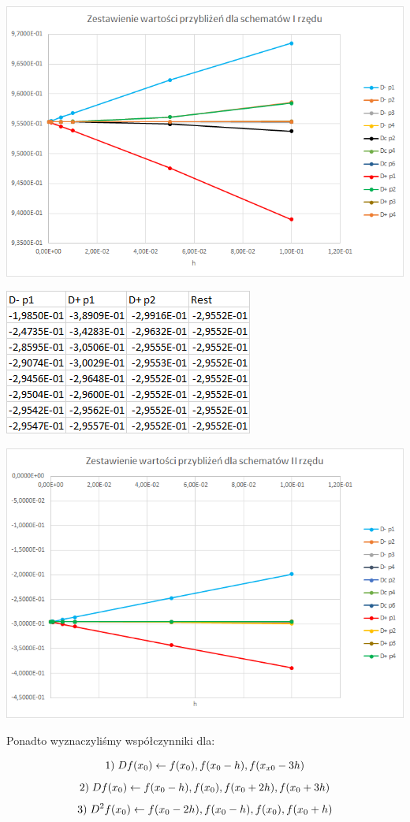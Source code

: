 \includegraphics{Lab2/charts/rz1_e.png}
\newpage


\includegraphics{Lab2/charts/rz2_e_dane.png}

\includegraphics{Lab2/charts/rz2_e.png}

\vspace{1cm}
Ponadto wyznaczyliśmy współczynniki dla:

$$1)\hspace{1mm}Df(x_{0}) \leftarrow f(x_{0}), f(x_{0}-h), f(x_{x0}-3h)$$
$$2)\hspace{1mm}Df(x_{0}) \leftarrow f(x_{0}-h), f(x_{0}), f(x_{0}+2h), f(x_{0}+3h)$$
$$3)\hspace{1mm}D^2f(x_{0}) \leftarrow f(x_{0}-2h), f(x_{0}-h), f(x_{0}), f(x_{0}+h)$$

